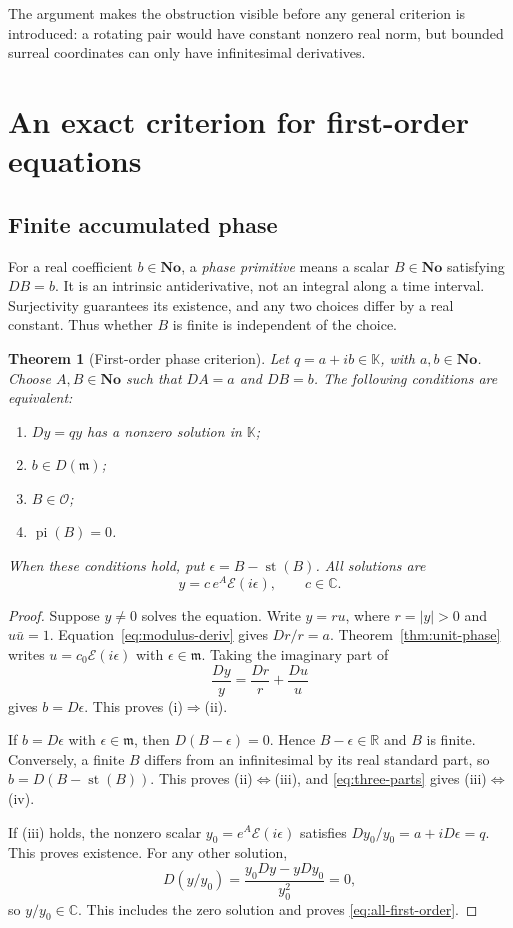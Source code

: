 \documentclass[11pt,a4paper]{article}
\numberwithin{equation}{section}
\newtheorem{theorem}{Theorem}[section]
\theoremstyle{definition}
\theoremstyle{remark}
\newcommand{\No}{\mathbf{No}}
\newcommand{\K}{\mathbb K}
\newcommand{\C}{\mathbb C}
\newcommand{\R}{\mathbb R}
\newcommand{\OO}{\mathcal O}
\newcommand{\mm}{\mathfrak m}
\newcommand{\EE}{\mathcal E}
\newcommand{\st}{\operatorname{st}}
\newcommand{\pipart}{\operatorname{pi}}
\newcommand{\abs}[1]{\lvert #1\rvert}
\begin{document}
The argument makes the obstruction visible before any general criterion is
introduced: a rotating pair would have constant nonzero real norm, but
bounded surreal coordinates can only have infinitesimal derivatives.

\section{An exact criterion for first-order equations}
\label{sec:first-order}

\subsection{Finite accumulated phase}

For a real coefficient $b\in\No$, a \emph{phase primitive} means a scalar
$B\in\No$ satisfying $DB=b$. It is an intrinsic antiderivative, not an
integral along a time interval. Surjectivity guarantees its existence, and
any two choices differ by a real constant. Thus whether $B$ is finite is
independent of the choice.

\begin{theorem}[First-order phase criterion]\label{thm:phase-criterion}
Let $q=a+ib\in\K$, with $a,b\in\No$. Choose $A,B\in\No$ such that
$DA=a$ and $DB=b$. The following conditions are equivalent:
\begin{enumerate}[label=(\roman*)]
\item $Dy=qy$ has a nonzero solution in $\K$;
\item $b\in D(\mm)$;
\item $B\in\OO$;
\item $\pipart(B)=0$.
\end{enumerate}
When these conditions hold, put $\epsilon=B-\st(B)$. All solutions are
\begin{equation}\label{eq:all-first-order}
 y=c\,e^A\EE(i\epsilon),\qquad c\in\C.
\end{equation}
\end{theorem}
\begin{proof}
Suppose $y\ne0$ solves the equation. Write $y=ru$, where $r=\abs y>0$
and $u\bar u=1$. Equation~\eqref{eq:modulus-deriv} gives $Dr/r=a$.
Theorem~\ref{thm:unit-phase} writes $u=c_0\EE(i\epsilon)$ with
$\epsilon\in\mm$. Taking the imaginary part of
\[
 \frac{Dy}{y}=\frac{Dr}{r}+\frac{Du}{u}
\]
gives $b=D\epsilon$. This proves (i)$\Rightarrow$(ii).

If $b=D\epsilon$ with $\epsilon\in\mm$, then
$D(B-\epsilon)=0$. Hence $B-\epsilon\in\R$ and $B$ is finite.
Conversely, a finite $B$ differs from an infinitesimal by its real standard
part, so $b=D(B-\st(B))$. This proves (ii)$\Leftrightarrow$(iii), and
\eqref{eq:three-parts} gives (iii)$\Leftrightarrow$(iv).

If (iii) holds, the nonzero scalar $y_0=e^A\EE(i\epsilon)$ satisfies
$Dy_0/y_0=a+iD\epsilon=q$. This proves existence. For any other solution,
\[
 D(y/y_0)=\frac{y_0Dy-yDy_0}{y_0^2}=0,
\]
so $y/y_0\in\C$. This includes the zero solution and proves
\eqref{eq:all-first-order}.
\end{proof}
\end{document}
